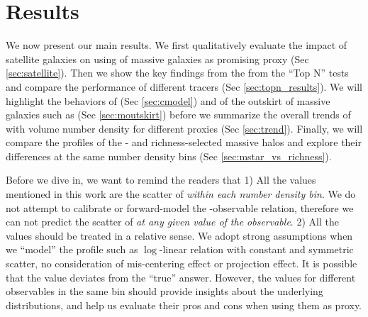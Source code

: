 \documentclass[fleqn,usenatbib,useAMS,english]{mnras}
\begin{document}
\section{Results}
    \label{sec:result}

    We now present our main results.
    We first qualitatively evaluate the impact of satellite galaxies on using \mstar{} of massive
    galaxies as promising \mvir{} proxy (Sec \ref{sec:satellite}).
    Then we show the key findings from the from the ``Top N'' tests and compare the performance
    of different \mvir{} tracers (Sec \ref{sec:topn_results}).
    We will highlight the behaviors of \mcmodel{} (Sec \ref{sec:cmodel}) and \mstar{}
    of the outskirt of massive galaxies such as  (Sec \ref{sec:moutskirt})
    before we summarize the overall trends of \sigmh{} with volume number density for different
    \mvir{} proxies (Sec \ref{sec:trend}).
    Finally, we will compare the \dsigma{} profiles of the \mstar{}- and richness-selected
    massive halos and explore their differences at the same number density bins
    (Sec \ref{sec:mstar_vs_richness}).

    Before we dive in, we want to remind the readers that
    1) All the \sigmh{} values mentioned in this work are the scatter of \mvir{} \emph{within each
    number density bin}. We do not attempt to calibrate or forward-model the \mvir{}-observable
    relation, therefore we can not predict the scatter of \mvir{} \emph{at any given value of
    the observable}.
    2) All the \sigmh{} values should be treated in a relative sense. We adopt strong
    assumptions when we ``model'' the \dsigma{} profile such as $\log$-linear relation with
    constant and symmetric scatter, no consideration of mis-centering effect or projection effect.
    It is possible that the \sigmh{} value deviates from the ``true'' answer.
    However, the \sigmh{} values for different observables in the same bin should provide
    insights about the underlying \mvir{} distributions, and help us evaluate their pros and cons
    when using them as \mvir{} proxy.
\end{document}
